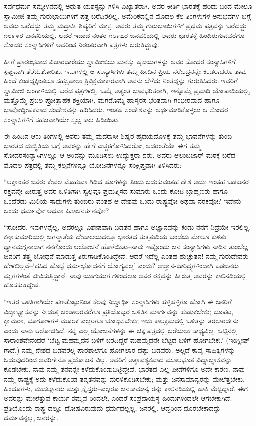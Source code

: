 ಸರ್ವಧರ್ಮ ಸಮ್ಮೇಳನದಲ್ಲಿ ಅದ್ಭುತ ಯಶಸ್ಸನ್ನು ಗಳಿಸಿ ವಿಖ್ಯಾತರಾಗಿ, ಅವರ ಕೀರ್ತಿ ಭಾರತಕ್ಕೆ ಹರಿದು ಬಂದ ಮೇಲೂ ಸ್ವಾಮೀಜಿ ತಮ್ಮ ಗುರುಭಾಯಿಗಳಿಗೆ ಪತ್ರ ಬರೆದಿರಲಿಲ್ಲ. ಅಮೆರಿಕದಲ್ಲಿನ ಮೊದಲ ಕೆಲ ತಿಂಗಳುಗಳ ಅನುಭವಗಳ ಬಗ್ಗೆ ಅವರು ಬರೆದದ್ದು ತಮ್ಮ ಮದ್ರಾಸೀ ಶಿಷ್ಯರಿಗೆ ಮಾತ್ರ. ಅವರು ತಮ್ಮ ಗುರುಭಾಯಿಗಳಿಗೆ ಪ್ರಥಮ ಪತ್ರವನ್ನು ಬರೆದದ್ದು ೧೮೯೪ರ ಜನವರಿಯಲ್ಲಿ. ಆದರೆ ಇದಾದ ನಂತರ ೧೮೯೭ರ ಜನವರಿಯಲ್ಲಿ ಅವರು ಭಾರತಕ್ಕೆ ಹಿಂದಿರುಗುವವರೆಗೂ ಸೋದರ ಸಂನ್ಯಾಸಿಗಳಿಗೆ ಅವರಿಂದ ನಿರಂತರವಾಗಿ ಪತ್ರಗಳು ಬರುತ್ತಿದ್ದುವು.

ಹೀಗೆ ಪ್ರಾರಂಭವಾದ ವಿಚಾರಧಾರೆಯು ಸ್ವಾಮೀಜಿಯ ಮನಸ್ಸು ಹೃದಯಗಳನ್ನು ಅವರ ಸೋದರ ಸಂನ್ಯಾಸಿಗಳಿಗೆ ಸ್ಪಷ್ಟವಾಗಿ ತೆರೆದುತೋರಿತು. ಇವುಗಳಲ್ಲಿ ಆ ಸಂನ್ಯಾಸಿಗಳು ತಮ್ಮ ಹಿಂದಿನ ಪ್ರಿಯ ನರೇಂದ್ರನನ್ನೇ ಕಂಡರಾದರೂ ತಾವು ಹಿಂದೆ ಕಂಡದ್ದಕ್ಕಿಂತಲೂ ಸಹಸ್ರಪಾಲು ತ್ರಿವಿಕ್ರಮಾಕಾರವಾಗಿ ಅವನು ಬೆಳೆದು ನಿಂತದ್ದನ್ನು ಗುರುತಿಸಿದರು. ಇವರಿಗೆ ಸ್ವಾಮೀಜಿ ಬಂಗಾಳಿಯಲ್ಲಿ ಬರೆದ ಪತ್ರಗಳಲ್ಲಿ, ಒಮ್ಮೆ ಅತ್ಯಂತ ಭಾವಭರಿತರಾಗಿ, ಇನ್ನೊಮ್ಮೆ ಪ್ರವಾದಿ ಯೋಪಾದಿಯಲ್ಲಿ, ಮತ್ತೊಮ್ಮೆ ಪ್ರಬಲ ಪ್ರೋತ್ಸಾಹಕ ಶಕ್ತಿಯಾಗಿ, ಮಗದೊಮ್ಮೆ ಹಾಸ್ಯರಸ ಭರಿತವಾಗಿ ಗಂಭೀರವಾದ ಹಾಗೂ ಭಾವೋದ್ದೀಪಕವಾದ ಸಂದೇಶವನ್ನು ಹರಿಸಿದರು. ಇಂತಹ ಸಂದೇಶವನ್ನು ಅರ್ಥಮಾಡಿಕೊಳ್ಳಲು ಆ ಸೋದರ ಸಂನ್ಯಾಸಿಗಳಿಗೆ ಸಹಜವಾಗಿಯೇ ಸ್ವಲ್ಪ ಕಾಲ ಹಿಡಿಯಿತು.

ಈ ಹಿಂದಿನ ಆರು ತಿಂಗಳಲ್ಲಿ ಅವರು ತಮ್ಮ ಮದರಾಸೀ ಶಿಷ್ಯರ ಹೃದಯದೊಳಕ್ಕೆ ತಮ್ಮ ಭಾವನೆಗಳನ್ನು ತುಂಬಿ ಭಾರತದ ದುಃಸ್ಥಿತಿಯ ಬಗ್ಗೆ ಅವರನ್ನು ಹೇಗೆ ಎಚ್ಚರಗೊಳಿಸಿದರೋ, ಅದರಂತೆಯೇ ಈಗ ತಮ್ಮ ಸೋದರಸಂನ್ಯಾಸಿಗಳಲ್ಲೂ ಆ ಅರಿವನ್ನು ಮೂಡಿಸಲು ಉದ್ಯುಕ್ತರಾ ದರು. ಅವರು ಆಲಂಬಜಾರ್ ಮಠಕ್ಕೆ ಬರೆದ ಮೊದಲ ಪತ್ರದಲ್ಲಿ ತಮ್ಮ ಕಲ್ಪನೆಗಳನ್ನೂ ಯೋಜನೆಗಳನ್ನೂ ಸಂಕ್ಷಿಪ್ತವಾಗಿ ತಿಳಿಸಿದರು:

“ಲಕ್ಷಾಂತರ ಜನರು ಕೇವಲ ಮೊಹುವಾ ಗಿಡಿದ ಹೂಗಳನ್ನು ತಿಂದು ಬದುಕುವಂತಹ ದೇಶ ಅದು; ಇಂತಹ ಬಡಜನರ ರಕ್ತವನ್ನೇ ಹೀರುತ್ತ ಅವರ ಒಳಿತಿಗಾಗಿ ಸ್ವಲ್ಪವೂ ಪ್ರಯತ್ನಿಸದ ಸುಮಾರು ಒಂದು ಕೋಟಿ ಬ್ರಾಹ್ಮಣರು ಹಾಗೂ ಒಂದೆರಡು ಮಿಲಿಯ ಸಾಧುಗಳು ತುಂಬಿರು ವಂತಹ ಆ ದೇಶವು ಒಂದು ರಾಷ್ಟ್ರವೋ ಅಥವಾ ನರಕವೋ? ಇದೇನು ಒಂದು ಧರ್ಮವೋ ಅಥವಾ ಪಿಶಾಚನರ್ತನವೋ?

“ಸೋದರ, ಇವುಗಳನ್ನೆಲ್ಲ, ಅದರಲ್ಲೂ ವಿಶೇಷವಾಗಿ ಬಡತನ ಹಾಗೂ ಅಜ್ಞಾನವನ್ನು ಕಂಡು ನನಗೆ ನಿದ್ರೆಯೇ ಇರಲಿಲ್ಲ. ಕನ್ಯಾಕುಮಾರಿಯಲ್ಲಿ ಜಗನ್ಮಾತೆಯ ದೇವಾಲಯದಲ್ಲೂ ಭಾರತದ ತುತ್ತತುದಿಯ ಬಂಡೆಯ ಮೇಲೂ ಕುಳಿತು ಧ್ಯಾನಮಗ್ನನಾದಾಗ ನನಗೊಂದು ಆಲೋಚನೆ ಹೊಳೆಯಿತು–ನಾವು ಇಷ್ಟೊಂದು ಜನ ಸಂನ್ಯಾಸಿಗಳು ನಾಡಿನ ತುಂಬೆಲ್ಲ ಜನರಿಗೆ ತತ್ತ್ವ ಬೋಧನೆ ಮಾಡುತ್ತ ತಿರುಗಾಡಿಕೊಂಡಿದ್ದೇವೆ. ಆದರೆ ಇದೆಲ್ಲ ಎಂತಹ ಹುಚ್ಚುತನ! ನಮ್ಮ ಗುರುದೇವರು ಹೇಳಲಿಲ್ಲವೆ–‘ಹಸಿದ ಹೊಟ್ಟೆ ಧರ್ಮಭೋದನೆಗೆ ಯೋಗ್ಯವಲ್ಲ’ ಎಂದು? ಅಜ್ಞಾನ-ದಾರಿದ್ರ್ಯಗಳಿಂದಾಗಿ ಬಡಜನರು ಮೃಗಗಳಂತೆ ಜೀವಿಸುತ್ತಿದ್ದಾರೆ. ನಾವು ಯುಗಯುಗ ಗಳಿಂದಲೂ ಅವರ ರಕ್ತವನ್ನು ಹೀರುತ್ತ ಅವರನ್ನು ಕಾಲಿನಡಿಯಲ್ಲಿ ಹೊಸಕುತ್ತಿದ್ದೇವೆ.

“ಇತರ ಒಳಿತಿಗಾಗಿಯೇ ಪಣತೊಟ್ಟುನಿಂತ ಕೆಲವು ನಿಃಸ್ವಾರ್ಥಿ ಸಂನ್ಯಾಸಿಗಳು ಹಳ್ಳಿಹಳ್ಳಿಗೂ ಹೋಗಿ ಈ ಜನರಿಗೆ ವಿದ್ಯಾಭ್ಯಾಸವನ್ನು ನೀಡುತ್ತ ಚಂಡಾಲರವರೆಗೂ ಪ್ರತಿಯೊಬ್ಬರ ಒಳಿತಿನ ಮಾರ್ಗವನ್ನು ಹುಡುಕಬೇಕು; ಭೂಪಟ, ಕ್ಯಾಮರಾ, ಭೂಗೋಳಗಳ ಮೂಲಕ ಎಲ್ಲರಿಗೂ ಬೋಧಿಸಬೇಕು; ಇದು ಕಾಲಕ್ರಮದಲ್ಲಿ ಒಳಿತನ್ನು ತರಲಾರದೇನು ಎಂದು ನಾನು ಆಲೋಚಿಸಿದೆ. ನನ್ನ ಎಲ್ಲ ಯೋಜನೆಗಳನ್ನು ಈ ಚಿಕ್ಕ ಪತ್ರದಲ್ಲಿ ಬರೆಯಲು ಸಾಧ್ಯವಿಲ್ಲ. ಒಟ್ಟಿನಲ್ಲಿ ಸಾರಾಂಶವೇನೆಂದರೆ ‘ಬೆಟ್ಟ ಮಹಮ್ಮದನ ಬಳಿಗೆ ಬರದಿದ್ದರೆ ಮಹಮ್ಮದನೇ ಬೆಟ್ಟದ ಬಳಿಗೆ ಹೋಗಬೇಕು.’ (ಇಂಗ್ಲೀಷ್ ಗಾದೆ.) ನಮ್ಮ ದೇಶದ ಬಡವರೆಲ್ಲ ಪಾಠಶಾಲೆಗೂ ಹೋಗಲಾರ ದಷ್ಟು ಬಡವರು. ಅಲ್ಲದೆ ಕಾವ್ಯ-ಸಾಹಿತ್ಯಗಳನ್ನು ಓದುವುದರಿಂದ ಅವರಿಗೇನೂ ಪ್ರಯೋಜನ ವಿಲ್ಲ. ಅವರಿಗೆ ಅತ್ಯಾವಶ್ಯಕವಾದ ಮೂಲಭೂತ ವಿದ್ಯಾಭ್ಯಾಸವನ್ನು ಕೊಡಬೇಕು. ನಾವು ನಮ್ಮ ತನವನ್ನೇ ಕಳೆದುಕೊಂಡುಬಿಟ್ಟಿದ್ದೇವೆ. ಭಾರತದ ಎಲ್ಲ ಪೀಡೆಗಳಿಗೂ ಅದೇ ಕಾರಣ. ನಾವು ನಮ್ಮ ರಾಷ್ಟ್ರಕ್ಕೆ ಅದು ಕಳೆದುಕೊಂಡ ತನ್ನತನವನ್ನು ಮರಳಿಕೊಡಿಸಬೇಕು; ಮತ್ತು ಜನಸಾಮಾನ್ಯರನ್ನು ಮೇಲೆತ್ತಬೇಕು. ಹಿಂದೂಗಳು, ಮುಸಲ್ಮಾನರು ಮತ್ತು ಕ್ರೈಸ್ತರು–ಎಲ್ಲರೂ ಜನಸಾಮಾನ್ಯ ರನ್ನು ಕಾಲಿನಡಿಯಲ್ಲಿ ಹಾಕಿ ಮೆಟ್ಟಿದ್ದಾರೆ. ಈಗ ಅವರನ್ನು ಮೇಲೆತ್ತುವ ಕಾರ್ಯ ನಮ್ಮವ ರಿಂದಲೇ, ಎಂದರೆ ಸಂಪ್ರದಾಯಸ್ಥ ಹಿಂದುಗಳಿಂದಲೇ ಆಗಬೇಕಾಗಿದೆ. ಪ್ರತಿಯೊಂದು ರಾಷ್ಟ್ರ ದಲ್ಲೂ ದೋಷವಿರುವುದು ಧರ್ಮದಲ್ಲಲ್ಲ, ಜನರಲ್ಲಿ. ಆದ್ದರಿಂದ ದೂರಬೇಕಾದದ್ದು ಧರ್ಮವನ್ನಲ್ಲ, ಜನರನ್ನು.

